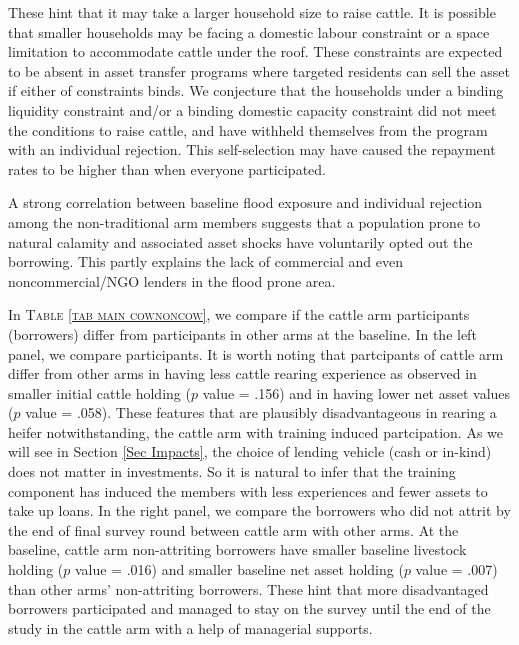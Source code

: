 	These hint that it may take a larger household size to raise cattle. %
	It is possible that smaller households may be facing a domestic labour constraint or a space limitation to accommodate cattle under the roof. These constraints are expected to be absent in asset transfer programs where targeted residents can sell the asset if either of constraints binds. We conjecture that the households under a binding liquidity constraint and/or a binding domestic capacity constraint did not meet the conditions to raise cattle, and have withheld themselves from the program with an individual rejection. This self-selection may have caused the repayment rates to be higher than when everyone participated. 

	A strong correlation between baseline flood exposure and individual rejection among the non-\textsf{traditional} arm members suggests that a population prone to natural calamity and associated asset shocks have voluntarily opted out the borrowing. This partly explains the lack of commercial and even noncommercial/NGO lenders in the flood prone area. 
	
	In \textsc{\small Table \ref{tab main cownoncow}}, we compare if the \textsf{cattle} arm participants (borrowers) differ from participants in other arms at the baseline. In the left panel, we compare participants. It is worth noting that partcipants of \textsf{cattle} arm differ from other arms in having less cattle rearing experience as observed in smaller initial cattle holding ($p$ value = .156) and in having lower net asset values ($p$ value = .058). 
	These features that are plausibly disadvantageous in rearing a heifer notwithstanding, the \textsf{cattle} arm with training induced partcipation. As we will see in Section \ref{Sec Impacts}, the choice of lending vehicle (cash or in-kind) does not matter in investments. So it is natural to infer that the training component has induced the members with less experiences and fewer assets to take up loans. In the right panel, we compare the borrowers who did not attrit by the end of final survey round between \textsf{cattle} arm with other arms. At the baseline, \textsf{cattle} arm non-attriting borrowers have smaller baseline livestock holding ($p$ value = .016) and smaller baseline net asset holding ($p$ value = .007) than other arms' non-attriting borrowers. %
	These hint that more disadvantaged borrowers participated and managed to stay on the survey until the end of the study in the \textsf{cattle} arm with a help of managerial supports.
	
